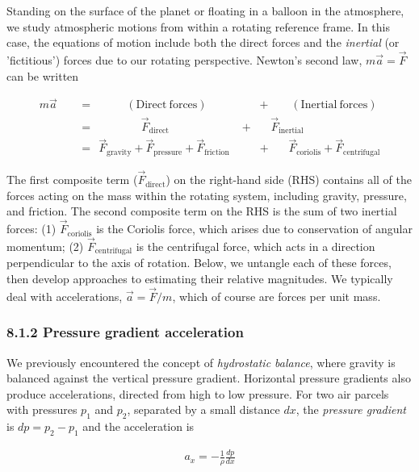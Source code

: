 \documentclass[11pt]{article}
\begin{document}
Standing on the surface of the planet or floating in a balloon in the
atmosphere, we study atmospheric motions from within a rotating
reference frame. In this case, the equations of motion include both the
direct forces and the \emph{inertial} (or 'fictitious') forces due to
our rotating perspective. Newton's second law, \(m\vec{a} = \vec{F}\)
can be written

\begin{align}
    m\vec{a} ~~~~~&= ~~~~~~~~~~~~~(\mathrm{Direct~forces}) ~~~~~~~~~~~~~~~~~~~~ + ~~~~~~~~(\mathrm{Inertial~forces}) \\
    &= ~~~~~~~~~~~~~~~~~~~\vec{F}_\mathrm{direct} ~~~~~~~~~~~~~~~~~~~~~~~~~~~~ + ~~~~~~~ \vec{F}_\mathrm{inertial} ~~~~ \\
    &= ~~\vec{F}_\mathrm{gravity} + \vec{F}_\mathrm{pressure} + \vec{F}_\mathrm{friction}~~~~~~~~~~~+ ~~~ ~~~~\vec{F}_\mathrm{coriolis} + \vec{F}_\mathrm{centrifugal}
\end{align}

The first composite term (\(\vec{F}_\mathrm{direct}\)) on the right-hand
side (RHS) contains all of the forces acting on the mass within the
rotating system, including gravity, pressure, and friction. The second
composite term on the RHS is the sum of two inertial forces: (1)
\(\vec{F}_\mathrm{coriolis}\) is the Coriolis force, which arises due to
conservation of angular momentum; (2) \(\vec{F}_\mathrm{centrifugal}\)
is the centrifugal force, which acts in a direction perpendicular to the
axis of rotation. Below, we untangle each of these forces, then develop
approaches to estimating their relative magnitudes. We typically deal
with accelerations, \(\vec{a} = \vec{F}/m\), which of course are forces
per unit mass.

    \subsubsection{8.1.2 Pressure gradient
acceleration}\label{pressure-gradient-acceleration}

We previously encountered the concept of \emph{hydrostatic balance},
where gravity is balanced against the vertical pressure gradient.
Horizontal pressure gradients also produce accelerations, directed from
high to low pressure. For two air parcels with pressures \(p_1\) and
\(p_2\), separated by a small distance \(dx\), the \emph{pressure
gradient} is \(dp = p_2 - p_1\) and the acceleration is

\begin{align}
    a_x = -\frac{1}{\rho}\frac{dp}{dx}
\end{align}
\end{document}
